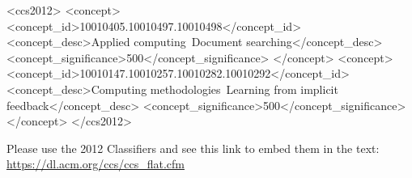 \documentclass{sigchi}
\begin{document}




\begin{CCSXML}
<ccs2012>
   <concept>
       <concept_id>10010405.10010497.10010498</concept_id>
       <concept_desc>Applied computing~Document searching</concept_desc>
       <concept_significance>500</concept_significance>
       </concept>
   <concept>
       <concept_id>10010147.10010257.10010282.10010292</concept_id>
       <concept_desc>Computing methodologies~Learning from implicit feedback</concept_desc>
       <concept_significance>500</concept_significance>
       </concept>
 </ccs2012>
\end{CCSXML}



\printccsdesc
Please use the 2012 Classifiers and see this link to embed them in the text: \url{https://dl.acm.org/ccs/ccs_flat.cfm}


\maketitle





\balance{}

\newcommand{\newblock}{}
%
%
\printbibliography
\end{document}
